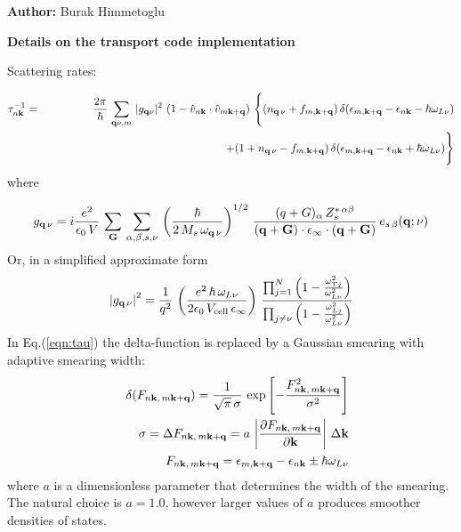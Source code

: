 \documentclass[
amsmath,amssymb,
aps,
prb,
]{revtex4}
\begin{document}
\begin{flushright}
 { {\bf Author:} Burak Himmetoglu}
\end{flushright}


\begin{center}
 {\bf Details on the transport code implementation}
\end{center}
%

Scattering rates:

\begin{eqnarray}
\tau_{n {\bf k}}^{-1} &=& \frac{2 \pi}{\hbar}\, \sum_{{\bf q} \nu, m}\, \vert g_{{\bf q} \nu} \vert^2\, 
  \left( 1 - {\hat v}_{n {\bf k}} \cdot {\hat v}_{m {\bf k+q}} \right)\, 
  \Bigg\{ (n_{{\bf q}\, \nu} + f_{m, {\bf k+q}})\, \delta( \epsilon_{m, {\bf k+q}} - \epsilon_{n {\bf k}} - \hbar\omega_{L \nu} ) \nonumber\\
%
 && \qquad\qquad\qquad\qquad\qquad\qquad\qquad\qquad
   +  (1 + n_{{\bf q}\, \nu} - f_{m, {\bf k+q}})\, \delta(\epsilon_{m, {\bf k+q}} - \epsilon_{n {\bf k}} + \hbar\omega_{L \nu} )
  \Bigg\} \label{eqn:tau}
\end{eqnarray}
% 
where 

%
\begin{equation}
g_{{\bf q}\, \nu} = i\frac{e^2}{\epsilon_0\, V}\, \sum_{\bf G}\, \sum_{\alpha, \beta, s, \nu}\,
  \left( \frac{\hbar}{2\, M_s\, \omega_{{\bf q}\, \nu}} \right)^{1/2}\, 
  \frac{ (q+G)_{\alpha}\, Z^{*\, \alpha \beta}_s } {({\bf q+G}) \cdot {\bf \epsilon}_{\infty} \cdot ({\bf q+G}) }\,
  e_{s\, \beta}({\bf q} ; \nu) \label{eqn:gnu}
\end{equation}
%
Or, in a simplified approximate form 
%
\begin{equation}
\left\vert g_{{\bf q}\, \nu} \right\vert^2 = \frac{1}{q^2}\, 
  \left( \frac{e^2\, \hbar\, \omega_{L\nu}}{2 \epsilon_0\, V_{\rm cell}\, \epsilon_{\infty}} \right)\,
  \frac{\prod_{j=1}^{N} \left(1-\frac{\omega_{T j}^2}{\omega_{L \nu}^2}\right)}
       {\prod_{j \neq \nu} \left( 1 - \frac{\omega_{L j}^2}{\omega_{L \nu}^2} \right)}
\label{eqn:gnu2}
\end{equation}
%
In Eq.(\ref{eqn:tau}) the delta-function is replaced by a Gaussian smearing with adaptive smearing width:
%
\begin{eqnarray}
&& \delta(F_{n{\bf k}, \, m{\bf k+q}}) = \frac{1}{\sqrt{\pi}\, \sigma}\, 
       \exp\left[ - \frac{ F_{n{\bf k}, \, m{\bf k+q}}^2 }{\sigma^2}  \right] \nonumber\\
&& \sigma = \Delta F_{n{\bf k}, \, m{\bf k+q}} = a\, \left\vert \frac{\partial F_{n{\bf k}, \, m{\bf k+q}}}{\partial {\bf k}} \right\vert\, \Delta {\bf k} \nonumber\\
&& F_{n{\bf k}, \, m{\bf k+q}} = \epsilon_{m, {\bf k+q}} - \epsilon_{n {\bf k}} \pm \hbar\omega_{L \nu} \label{eqn:sigma}
\end{eqnarray}
%
where $a$ is a dimensionless parameter that determines the width of the smearing. The natural choice is $a=1.0$, however larger values of
$a$ produces smoother densities of states.
\end{document}
